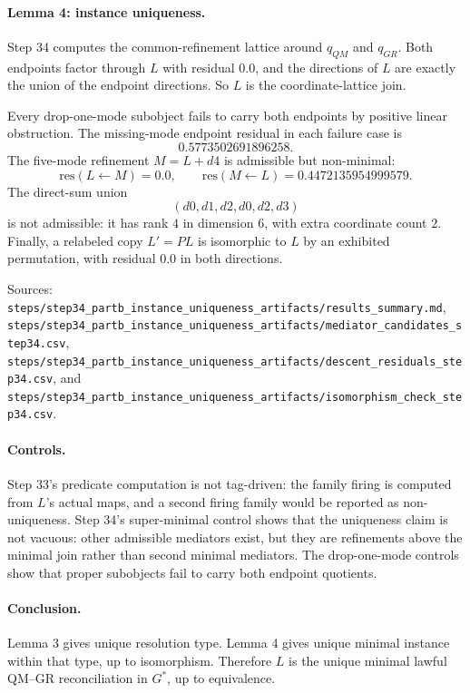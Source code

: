 \paragraph{Lemma 4: instance uniqueness.}
Step 34 computes the common-refinement lattice around \(q_{QM}\) and
\(q_{GR}\).  Both endpoints factor through \(L\) with residual \(0.0\), and
the directions of \(L\) are exactly the union of the endpoint directions.  So
\(L\) is the coordinate-lattice join.

Every drop-one-mode subobject fails to carry both endpoints by positive linear
obstruction.  The missing-mode endpoint residual in each failure case is
\[
  0.5773502691896258.
\]
The five-mode refinement \(M=L+d4\) is admissible but non-minimal:
\[
  \mathrm{res}(L\leftarrow M)=0.0,
  \qquad
  \mathrm{res}(M\leftarrow L)=0.4472135954999579.
\]
The direct-sum union
\[
  (d0,d1,d2,d0,d2,d3)
\]
is not admissible: it has rank \(4\) in dimension \(6\), with extra coordinate
count \(2\).  Finally, a relabeled copy \(L'=PL\) is isomorphic to \(L\) by an
exhibited permutation, with residual \(0.0\) in both directions.

Sources:
\texttt{steps/step34\_partb\_instance\_uniqueness\_artifacts/results\_summary.md},
\texttt{steps/step34\_partb\_instance\_uniqueness\_artifacts/mediator\_candidates\_step34.csv},
\texttt{steps/step34\_partb\_instance\_uniqueness\_artifacts/descent\_residuals\_step34.csv},
and
\texttt{steps/step34\_partb\_instance\_uniqueness\_artifacts/isomorphism\_check\_step34.csv}.

\paragraph{Controls.}
Step 33's predicate computation is not tag-driven: the family firing is
computed from \(L\)'s actual maps, and a second firing family would be reported
as non-uniqueness.  Step 34's super-minimal control shows that the uniqueness
claim is not vacuous: other admissible mediators exist, but they are
refinements above the minimal join rather than second minimal mediators.  The
drop-one-mode controls show that proper subobjects fail to carry both endpoint
quotients.

\paragraph{Conclusion.}
Lemma 3 gives unique resolution type.  Lemma 4 gives unique minimal instance
within that type, up to isomorphism.  Therefore \(L\) is the unique minimal
lawful QM--GR reconciliation in \(G^\ast\), up to equivalence.


